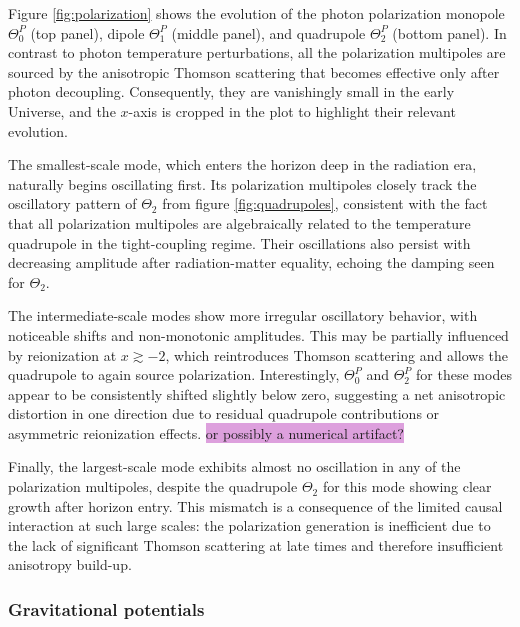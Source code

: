 \documentclass{aa}
\numberwithin{equation}{section}
\numberwithin{table}{section}
\numberwithin{figure}{section}
\begin{document}
Figure \ref{fig:polarization} shows the evolution of the photon polarization monopole $\Theta^P_{0}$ (top panel), dipole $\Theta^P_{1}$ (middle panel), and quadrupole $\Theta^P_{2}$ (bottom panel). In contrast to photon temperature perturbations, all the polarization multipoles are sourced by the anisotropic Thomson scattering that becomes effective only after photon decoupling. Consequently, they are vanishingly small in the early Universe, and the $x$-axis is cropped in the plot to highlight their relevant evolution.

The smallest-scale mode, which enters the horizon deep in the radiation era, naturally begins oscillating first. Its polarization multipoles closely track the oscillatory pattern of $\Theta_2$ from figure \ref{fig:quadrupoles}, consistent with the fact that all polarization multipoles are algebraically related to the temperature quadrupole in the tight-coupling regime. Their oscillations also persist with decreasing amplitude after radiation-matter equality, echoing the damping seen for $\Theta_2$.

The intermediate-scale modes show more irregular oscillatory behavior, with noticeable shifts and non-monotonic amplitudes. This may be partially influenced by reionization at $x \gtrsim -2$, which reintroduces Thomson scattering and allows the quadrupole to again source polarization. Interestingly, $\Theta^P_{0}$ and $\Theta^P_{2}$ for these modes appear to be consistently shifted slightly below zero, suggesting a net anisotropic distortion in one direction due to residual quadrupole contributions or asymmetric reionization effects. \colorbox{Plum}{or possibly a numerical artifact?}

Finally, the largest-scale mode exhibits almost no oscillation in any of the polarization multipoles, despite the quadrupole $\Theta_2$ for this mode showing clear growth after horizon entry. This mismatch is a consequence of the limited causal interaction at such large scales: the polarization generation is inefficient due to the lack of significant Thomson scattering at late times and therefore insufficient anisotropy build-up.



\subsubsection{Gravitational potentials}\label{subsubsec: III results Phi and Psi}
\end{document}
